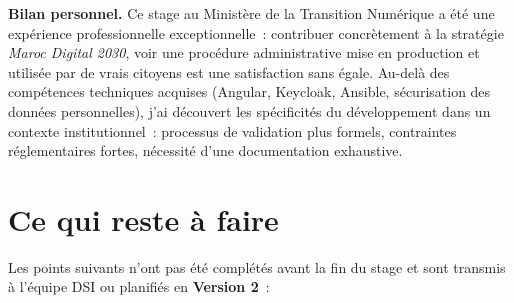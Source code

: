 \documentclass[a4paper,11pt]{article}
\begin{document}
\vspace{1em}

\begin{mdframed}[style=InfoBox]
\textbf{Bilan personnel.}
Ce stage au Minist\`{e}re de la Transition Num\'{e}rique a \'{e}t\'{e} une exp\'{e}rience
professionnelle exceptionnelle~: contribuer concr\`{e}tement \`{a} la strat\'{e}gie
\textit{Maroc Digital 2030}, voir une proc\'{e}dure administrative mise en production et
utilis\'{e}e par de vrais citoyens est une satisfaction sans \'{e}gale.
Au-del\`{a} des comp\'{e}tences techniques acquises (Angular, Keycloak, Ansible,
s\'{e}curisation des donn\'{e}es personnelles), j'ai d\'{e}couvert les sp\'{e}cificit\'{e}s
du d\'{e}veloppement dans un contexte institutionnel~: processus de validation plus formels,
contraintes r\'{e}glementaires fortes, n\'{e}cessit\'{e} d'une documentation exhaustive.
\end{mdframed}

\section{Ce qui reste \`{a} faire}
\label{sec:reste}

Les points suivants n'ont pas \'{e}t\'{e} compl\'{e}t\'{e}s avant la fin du stage
et sont transmis \`{a} l'\'{e}quipe DSI ou planifi\'{e}s en \textbf{Version 2}~:
\end{document}
